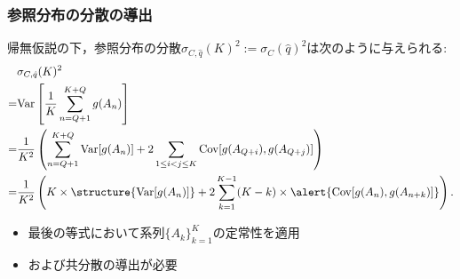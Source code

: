 \documentclass[dvipdfmx,11pt]{beamer}
\begin{document}
\begin{frame}[c]\frametitle{参照分布の分散の導出}
帰無仮説の下，\textcolor{MyGreen}{参照分布の分散}$\sigma_{C,\hat{q}}(K)^2:=\sigma_C(\hat{q})^2$は次のように与えられる:
%
\small
\begin{align*}\begin{split}
  &\sigma_{C,\hat{q}}(K)^2  \\
  =& \mathrm{Var} \left[ \frac{1}{K} \sum_{n=Q+1}^{K+Q} g(A_n) \right] \\
  =& \frac{1}{K^2} \left( \sum_{n=Q+1}^{K+Q} \mathrm{Var} [g(A_n)] + 2 \sum_{1 \leq i < j \leq K} \mathrm{Cov} [g(A_{Q+i}), g(A_{Q+j})] \right) \\
  =& \frac{1}{K^2} \left( K \times \structure{\mathrm{Var} [g(A_n)]} + 2\sum_{k=1}^{K-1}(K-k)\times\alert{\mathrm{Cov}[g(A_n),g(A_{n+k})]} \right).
\end{split}\end{align*}
\normalsize
\begin{itemize}\setlength{\itemsep}{0.5\baselineskip}
  \item 最後の等式において系列$\{A_k\}_{k=1}^{K}$の定常性を適用
  \item {}および\alert{共分散}の導出が必要
\end{itemize}
\end{frame}
\end{document}
